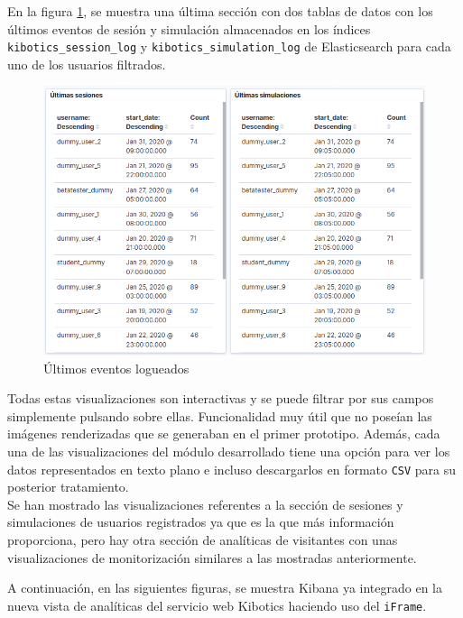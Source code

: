 \documentclass[a4paper, 12pt]{book}
\begin{document}
		En la figura \ref{fig:kibana_latestevent}, se muestra una última sección con dos tablas de datos con los últimos eventos de sesión y simulación almacenados en los índices \texttt{kibotics\_session\_log} y \texttt{kibotics\_simulation\_log} de Elasticsearch para cada uno de los usuarios filtrados. 
		\begin{figure}[H]
			\centering
			\includegraphics[width=12cm, keepaspectratio]{img/kibana_08_latest_event}
			\caption{Últimos eventos logueados}
			\label{fig:kibana_latestevent}
		\end{figure}
		
		Todas estas visualizaciones son interactivas y se puede filtrar por sus campos simplemente pulsando sobre ellas. Funcionalidad muy útil que no poseían las imágenes renderizadas que se generaban en el primer prototipo. Además, cada una de las visualizaciones del módulo desarrollado tiene una opción para ver los datos representados en texto plano e incluso descargarlos en formato \texttt{CSV} para su posterior tratamiento.\\
		
		Se han mostrado las visualizaciones referentes a la sección de sesiones y simulaciones de usuarios registrados ya que es la que más información proporciona, pero hay otra sección de analíticas de visitantes con unas visualizaciones de monitorización similares a las mostradas anteriormente.
		
	 	A continuación, en las siguientes figuras, se muestra Kibana ya integrado en la nueva vista de analíticas del servicio web Kibotics haciendo uso del \texttt{iFrame}.
				
\end{document}

